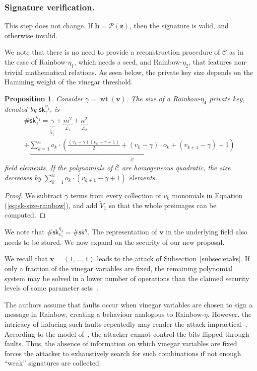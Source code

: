 \documentclass[12pt, a4paper, oneside]{memoir}
\DeclareMathOperator*{\wt}{wt}
\newtheorem{proposition}[theorem]{Proposition}
\theoremstyle{definition}
\begin{document}
\subsubsection{Signature verification.}

This step does not change. If $\mathbf{h} = \mathcal{P}(\mathbf{z})$, then the signature is valid, and otherwise invalid.

We note that there is no need to provide a reconstruction procedure of $\overline{\mathcal{C}}$ as in the case of Rainbow-$\eta_{1}$, which needs a seed, and Rainbow-$\eta_{2}$, that features non-trivial mathematical relations. As seen below, the private key size depends on the Hamming weight of the vinegar threshold.
\begin{proposition}
  Consider $\gamma = \wt(\mathbf{v})$. The size of a Rainbow-$\eta_{4}$ private key, denoted by $\textsf{sk}^{\eta_{4}}_{\gamma}$, is
  \begin{multline}
    \#\textsf{sk}^{\eta_{4}}_{\gamma} = \underbrace{\gamma}_{\widetilde{V}_{1}}
      + \underbrace{m^{2}}_{\mathcal{L}_{1}}
      + \underbrace{n^{2}}_{\mathcal{L}_{2}} \\
      + \underbrace{\sum_{k = 1}^{u} o_{k} \cdot \left( \frac{(v_{k} - \gamma)(v_{k} - \gamma + 1)}{2}
        + (v_{k} - \gamma) \cdot o_{k} + (v_{k + 1} - \gamma) + 1 \right)}_{\overline{\mathcal{C}}}
  \end{multline}
  field elements. If the polynomials of $\overline{\mathcal{C}}$ are homogeneous quadratic, the size decreases by $\sum_{k = 1}^{u} o_{k} \cdot (v_{k + 1} - \gamma + 1)$ elements.
\end{proposition}
\begin{proof}
  We subtract $\gamma$ terms from every collection of $v_{k}$ monomials in Equation (\ref{eq:sk-size-rainbow}), and add $\widetilde{V}_{1}$ so that the whole preimages can be computed.
\end{proof}
We note that $\#\textsf{sk}^{\eta_{4}}_{v_{1}} = \#\textsf{sk}^{\eta}$. The representation of $\mathbf{v}$ in the underlying field also needs to be stored. We now expand on the security of our new proposal.

We recall that $\mathbf{v} = (1, \dots, 1)$ leads to the attack of Subsection~\ref{subsec:etaks}. If only a fraction of the vinegar variables are fixed, the remaining polynomial system may be solved in a lower number of operations than the claimed security levels of some parameter sets~\cite{Shim:202002}. 

The authors assume that faults occur when vinegar variables are chosen to sign a message in Rainbow, creating a behaviour analogous to Rainbow-$\eta$. However, the intricacy of inducing such faults repeatedly may render the attack impractical~\cite{Mus:202011}. According to the model of~\cite{Shim:202002}, the attacker cannot control the bits flipped through faults. Thus, the absence of information on which vinegar variables are fixed forces the attacker to exhaustively search for such combinations if not enough ``weak'' signatures are collected.
\end{document}
